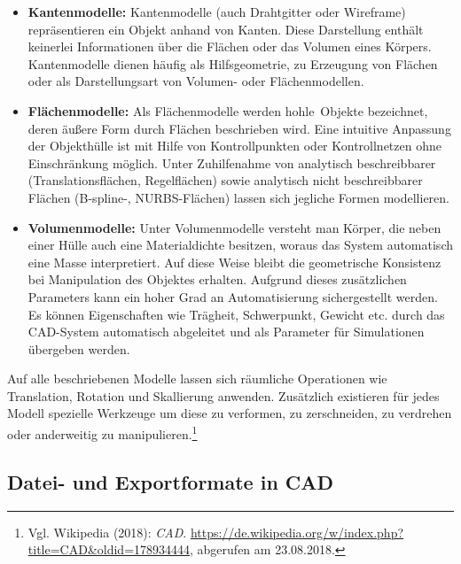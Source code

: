 \begin{itemize}
\item \textbf{Kantenmodelle:} Kantenmodelle (auch Drahtgitter oder Wireframe) repräsentieren ein Objekt anhand von Kanten. Diese Darstellung enthält keinerlei Informationen über die Flächen oder das Volumen eines Körpers. Kantenmodelle dienen häufig als Hilfsgeometrie, zu Erzeugung von Flächen oder als Darstellungsart von Volumen- oder Flächenmodellen.

\item \textbf{Flächenmodelle:} Als Flächenmodelle werden \glqq hohle\grqq\ Objekte bezeichnet, deren äußere Form durch Flächen beschrieben wird. Eine intuitive Anpassung der Objekthülle ist mit Hilfe von Kontrollpunkten oder Kontrollnetzen ohne Einschränkung möglich. Unter Zuhilfenahme von analytisch beschreibbarer (Translationsflächen, Regelflächen) sowie analytisch nicht beschreibbarer Flächen (B-spline-, NURBS-Flächen) lassen sich jegliche Formen modellieren.

\item \textbf{Volumenmodelle:} Unter Volumenmodelle versteht man Körper, die neben einer Hülle auch eine Materialdichte besitzen, woraus das System automatisch eine Masse interpretiert. Auf diese Weise bleibt die geometrische Konsistenz bei Manipulation des Objektes erhalten. Aufgrund dieses zusätzlichen Parameters kann ein hoher Grad an Automatisierung sichergestellt werden. Es können Eigenschaften wie Trägheit, Schwerpunkt, Gewicht etc. durch das CAD-System automatisch abgeleitet und als Parameter für Simulationen übergeben werden.  
\end{itemize}

Auf alle beschriebenen Modelle lassen sich räumliche Operationen wie Translation, Rotation und Skallierung anwenden. Zusätzlich existieren für jedes Modell spezielle Werkzeuge um diese zu verformen, zu zerschneiden, zu verdrehen oder anderweitig zu manipulieren.\footnote{Vgl. Wikipedia  (2018): \textit{CAD}.\newline
\url{https://de.wikipedia.org/w/index.php?title=CAD&oldid=178934444},\newline 
abgerufen am 23.08.2018.} 

\subsection{Datei- und Exportformate in CAD}
\label{subsec:Datei-undExportformateInCAD}



\clearpage

